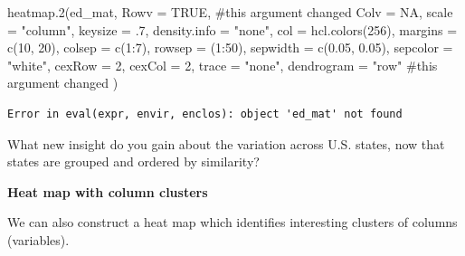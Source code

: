 \documentclass[
  letterpaper,
  DIV=11,
  numbers=noendperiod]{scrreprt}
\newenvironment{Shaded}{\begin{snugshade}}{\end{snugshade}}
\newcommand{\AttributeTok}[1]{\textcolor[rgb]{0.40,0.45,0.13}{#1}}
\newcommand{\CommentTok}[1]{\textcolor[rgb]{0.37,0.37,0.37}{#1}}
\newcommand{\ConstantTok}[1]{\textcolor[rgb]{0.56,0.35,0.01}{#1}}
\newcommand{\DecValTok}[1]{\textcolor[rgb]{0.68,0.00,0.00}{#1}}
\newcommand{\FloatTok}[1]{\textcolor[rgb]{0.68,0.00,0.00}{#1}}
\newcommand{\FunctionTok}[1]{\textcolor[rgb]{0.28,0.35,0.67}{#1}}
\newcommand{\NormalTok}[1]{\textcolor[rgb]{0.00,0.23,0.31}{#1}}
\newcommand{\SpecialCharTok}[1]{\textcolor[rgb]{0.37,0.37,0.37}{#1}}
\newcommand{\StringTok}[1]{\textcolor[rgb]{0.13,0.47,0.30}{#1}}
\begin{document}
\begin{Shaded}
\begin{Highlighting}[]
\FunctionTok{heatmap.2}\NormalTok{(ed\_mat,}
  \AttributeTok{Rowv =} \ConstantTok{TRUE}\NormalTok{, }\CommentTok{\#this argument changed}
  \AttributeTok{Colv =} \ConstantTok{NA}\NormalTok{, }\AttributeTok{scale =} \StringTok{"column"}\NormalTok{, }\AttributeTok{keysize =}\NormalTok{ .}\DecValTok{7}\NormalTok{,}
  \AttributeTok{density.info =} \StringTok{"none"}\NormalTok{, }\AttributeTok{col =} \FunctionTok{hcl.colors}\NormalTok{(}\DecValTok{256}\NormalTok{),}
  \AttributeTok{margins =} \FunctionTok{c}\NormalTok{(}\DecValTok{10}\NormalTok{, }\DecValTok{20}\NormalTok{),}
  \AttributeTok{colsep =} \FunctionTok{c}\NormalTok{(}\DecValTok{1}\SpecialCharTok{:}\DecValTok{7}\NormalTok{), }\AttributeTok{rowsep =}\NormalTok{ (}\DecValTok{1}\SpecialCharTok{:}\DecValTok{50}\NormalTok{), }\AttributeTok{sepwidth =} \FunctionTok{c}\NormalTok{(}\FloatTok{0.05}\NormalTok{, }\FloatTok{0.05}\NormalTok{),}
  \AttributeTok{sepcolor =} \StringTok{"white"}\NormalTok{, }\AttributeTok{cexRow =} \DecValTok{2}\NormalTok{, }\AttributeTok{cexCol =} \DecValTok{2}\NormalTok{, }\AttributeTok{trace =} \StringTok{"none"}\NormalTok{,}
  \AttributeTok{dendrogram =} \StringTok{"row"} \CommentTok{\#this argument changed}
\NormalTok{)}
\end{Highlighting}
\end{Shaded}

\begin{verbatim}
Error in eval(expr, envir, enclos): object 'ed_mat' not found
\end{verbatim}

\begin{Shaded}
\begin{Highlighting}[]
\NormalTok{What new insight do you gain about the variation across U.S. states, now that states are grouped and ordered by similarity?}
\end{Highlighting}
\end{Shaded}

\textbf{Heat map with column clusters}

We can also construct a heat map which identifies interesting clusters
of columns (variables).
\end{document}
